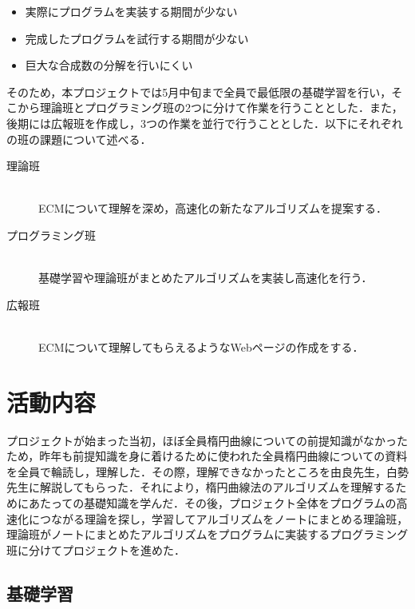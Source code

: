 \documentclass[openany,11pt,papersize]{jsbook}
\begin{document}
\begin{itemize}
\item 実際にプログラムを実装する期間が少ない
\item 完成したプログラムを試行する期間が少ない
\item 巨大な合成数の分解を行いにくい
\end{itemize}

そのため，本プロジェクトでは5月中旬まで全員で最低限の基礎学習を行い，そこから理論班とプログラミング班の2つに分けて作業を行うこととした．また，後期には広報班を作成し，3つの作業を並行で行うこととした．以下にそれぞれの班の課題について述べる．

\begin{description}
 \item[理論班]\mbox{}\\ 
	    ECMについて理解を深め，高速化の新たなアルゴリズムを提案する．
 \item[プログラミング班]\mbox{}\\
	    基礎学習や理論班がまとめたアルゴリズムを実装し高速化を行う．
 \item[広報班]\mbox{}\\
	    ECMについて理解してもらえるようなWebページの作成をする．
\end{description}

\chapter{活動内容}

プロジェクトが始まった当初，ほぼ全員楕円曲線についての前提知識がなかったため，昨年も前提知識を身に着けるために使われた全員楕円曲線についての資料を全員で輪読し，理解した．その際，理解できなかったところを由良先生，白勢先生に解説してもらった．それにより，楕円曲線法のアルゴリズムを理解するためにあたっての基礎知識を学んだ．その後，プロジェクト全体をプログラムの高速化につながる理論を探し，学習してアルゴリズムをノートにまとめる理論班，理論班がノートにまとめたアルゴリズムをプログラムに実装するプログラミング班に分けてプロジェクトを進めた．


\section{基礎学習}
\end{document}
